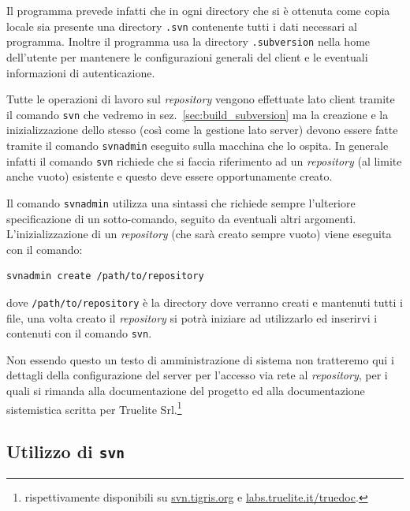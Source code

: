 Il programma prevede infatti che in ogni directory che si è ottenuta come
copia locale sia presente una directory \texttt{.svn} contenente tutti i dati
necessari al programma. Inoltre il programma usa la directory
\texttt{.subversion} nella home dell'utente per mantenere le configurazioni
generali del client e le eventuali informazioni di autenticazione. 

Tutte le operazioni di lavoro sul \textit{repository} vengono effettuate lato
client tramite il comando \texttt{svn} che vedremo in
sez.~\ref{sec:build_subversion} ma la creazione e la inizializzazione dello
stesso (così come la gestione lato server) devono essere fatte tramite il
comando \texttt{svnadmin} eseguito sulla macchina che lo ospita. In generale
infatti il comando \texttt{svn} richiede che si faccia riferimento ad un
\textit{repository} (al limite anche vuoto) esistente e questo deve essere
opportunamente creato.

Il comando \texttt{svnadmin} utilizza una sintassi che richiede sempre
l'ulteriore specificazione di un sotto-comando, seguito da eventuali altri
argomenti. L'inizializzazione di un \textit{repository} (che sarà creato
sempre vuoto) viene eseguita con il comando:
\begin{verbatim}
svnadmin create /path/to/repository
\end{verbatim}
dove \texttt{/path/to/repository} è la directory dove verranno creati e
mantenuti tutti i file, una volta creato il \textit{repository} si potrà
iniziare ad utilizzarlo ed inserirvi i contenuti con il comando \texttt{svn}. 

Non essendo questo un testo di amministrazione di sistema non tratteremo qui i
dettagli della configurazione del server per l'accesso via rete al
\textit{repository}, per i quali si rimanda alla documentazione del progetto
ed alla documentazione sistemistica scritta per Truelite
Srl.\footnote{rispettivamente disponibili su \url{svn.tigris.org} e
  \url{labs.truelite.it/truedoc}.}

\subsection{Utilizzo di \texttt{svn}}
\label{sec:build_svn_use}

